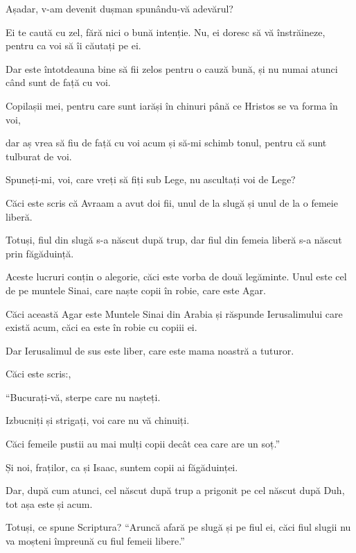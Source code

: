 {Așadar, v-am devenit dușman spunându-vă adevărul?

Ei te caută cu zel, fără nici o bună intenție. Nu, ei doresc să vă înstrăineze, pentru ca voi să îi căutați pe ei.

Dar este întotdeauna bine să fii zelos pentru o cauză bună, și nu numai atunci când sunt de față cu voi.


\par }{\PP {}Copilașii mei, pentru care sunt iarăși în chinuri până ce Hristos se va forma în voi,

dar aș vrea să fiu de față cu voi acum și să-mi schimb tonul, pentru că sunt tulburat de voi.


\par }{\PP {}Spuneți-mi, voi, care vreți să fiți sub Lege, nu ascultați voi de Lege?

Căci este scris că Avraam a avut doi fii, unul de la slugă și unul de la o femeie liberă.

Totuși, fiul din slugă s-a născut după trup, dar fiul din femeia liberă s-a născut prin făgăduință.

Aceste lucruri conțin o alegorie, căci este vorba de două legăminte. Unul este cel de pe muntele Sinai, care naște copii în robie, care este Agar.

Căci această Agar este Muntele Sinai din Arabia și răspunde Ierusalimului care există acum, căci ea este în robie cu copiii ei.

Dar Ierusalimul de sus este liber, care este mama noastră a tuturor.

Căci este scris:,

\par }{\Q “Bucurați-vă, sterpe care nu nașteți.

\par }{\QB Izbucniți și strigați, voi care nu vă chinuiți.

\par }{\QB Căci femeile pustii au mai mulți copii decât cea care are un soț.”


\par }{\PP {}Și noi, fraților, ca și Isaac, suntem copii ai făgăduinței.

Dar, după cum atunci, cel născut după trup a prigonit pe cel născut după Duh, tot așa este și acum.

Totuși, ce spune Scriptura? “Aruncă afară pe slugă și pe fiul ei, căci fiul slugii nu va moșteni împreună cu fiul femeii libere.”

}
